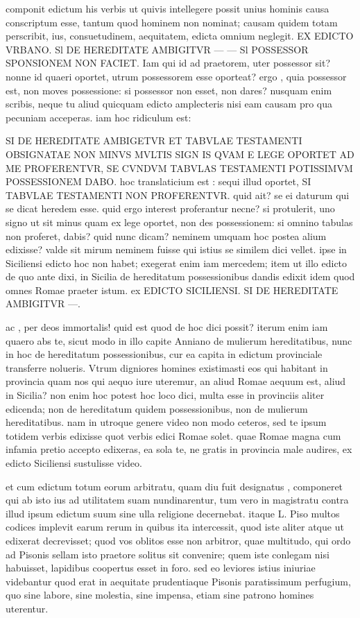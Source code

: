  componit edictum his verbis ut quivis intellegere possit unius hominis causa conscriptum esse, tantum quod hominem non nominat; causam quidem totam perscribit, ius, consuetudinem, aequitatem, edicta omnium neglegit. EX EDICTO VRBANO. Sl DE HEREDITATE AMBIGITVR — — Sl POSSESSOR SPONSIONEM NON FACIET. Iam qui id ad praetorem, uter possessor sit? nonne id quaeri oportet, utrum possessorem esse oporteat? ergo , quia possessor est, non moves possessione: si possessor non esset, non dares? nusquam enim scribis, neque tu aliud quicquam edicto amplecteris nisi eam causam pro qua pecuniam acceperas. iam hoc ridiculum est:

 SI DE HEREDITATE AMBIGETVR ET TABVLAE TESTAMENTI OBSIGNATAE NON MINVS MVLTIS SIGN IS QVAM E LEGE OPORTET AD ME PROFERENTVR, SE CVNDVM TABVLAS TESTAMENTI POTISSIMVM POSSESSIONEM DABO. hoc translaticium est : sequi illud oportet, SI TABVLAE TESTAMENTI NON PROFERENTVR. quid ait? se ei daturum qui se dicat heredem esse. quid ergo interest proferantur necne? si protulerit, uno signo ut sit minus quam ex lege oportet, non des possessionem: si omnino tabulas non proferet, dabis? quid nunc dicam? neminem umquam hoc postea alium edixisse? valde sit mirum neminem fuisse qui istius se similem dici vellet. ipse in Siciliensi edicto hoc non habet; exegerat enim iam mercedem; item ut illo edicto de quo ante dixi, in Sicilia de hereditatum possessionibus dandis edixit idem quod omnes Romae praeter istum. ex EDICTO SICILIENSI. SI DE HEREDITATE AMBIGITVR —.

 ac , per deos immortalis! quid est quod de hoc dici possit? iterum enim iam quaero abs te, sicut modo in illo capite Anniano de mulierum hereditatibus, nunc in hoc de hereditatum possessionibus, cur ea capita in edictum provinciale transferre nolueris. Vtrum digniores homines existimasti eos qui habitant in provincia quam nos qui aequo iure uteremur, an aliud Romae aequum est, aliud in Sicilia? non enim hoc potest hoc loco dici, multa esse in provinciis aliter edicenda; non de hereditatum quidem possessionibus, non de mulierum hereditatibus. nam in utroque genere video non modo ceteros, sed te ipsum totidem verbis edixisse quot verbis edici Romae solet. quae Romae magna cum infamia pretio accepto edixeras, ea sola te, ne gratis in provincia male audires, ex edicto Siciliensi sustulisse video.

 et cum edictum totum eorum arbitratu, quam diu fuit designatus , componeret qui ab isto ius ad utilitatem suam nundinarentur, tum vero in magistratu contra illud ipsum edictum suum sine ulla religione decernebat. itaque L. Piso multos codices implevit earum rerum in quibus ita intercessit, quod iste aliter atque ut edixerat decrevisset; quod vos oblitos esse non arbitror, quae multitudo, qui ordo ad Pisonis sellam isto praetore solitus sit convenire; quem iste conlegam nisi habuisset, lapidibus coopertus esset in foro. sed eo leviores istius iniuriae videbantur quod erat in aequitate prudentiaque Pisonis paratissimum perfugium, quo sine labore, sine molestia, sine impensa, etiam sine patrono homines uterentur.

